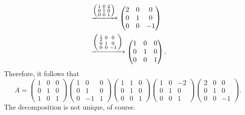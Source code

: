 \documentclass[11pt,oneside]{amsart}
\theoremstyle{definition}
\begin{document}
\begin{solution}
\[\begin{split}
            &\xrightarrow{\begin{psmallmatrix}1&0&2\\0&1&0\\0&0&1\end{psmallmatrix}}\begin{pmatrix}
                2&0&0\\
                0&1&0\\
                0&0&-1
            \end{pmatrix}\\
            &\xrightarrow{\begin{psmallmatrix}\frac 12&0&0\\0&1&0\\0&0&-1\end{psmallmatrix}}\begin{pmatrix}
                1&0&0\\
                0&1&0\\
                0&0&1
            \end{pmatrix}.
        \end{split}\]
        Therefore, it follows that
        \[A=\begin{pmatrix}
            1&0&0\\0&1&0\\1&0&1
        \end{pmatrix}\begin{pmatrix}
            1&0&0\\0&1&0\\0&-1&1
        \end{pmatrix}\begin{pmatrix}
            1&1&0\\0&1&0\\0&0&1
        \end{pmatrix}\begin{pmatrix}
            1&0&-2\\0&1&0\\0&0&1
        \end{pmatrix}\begin{pmatrix}
            2&0&0\\0&1&0\\0&0&-1
        \end{pmatrix}.\]
        The decomposition is not unique, of course.
    \end{solution}
\end{document}
